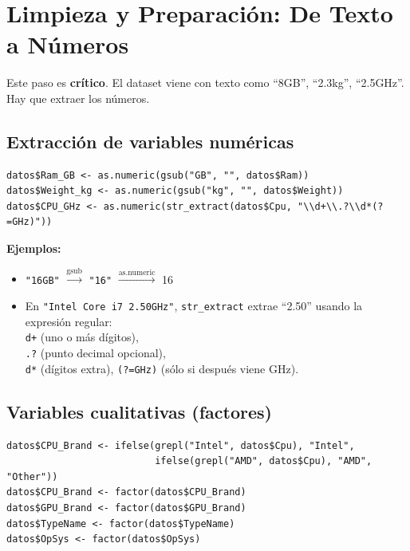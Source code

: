 \documentclass[12pt,a4paper]{article}
\begin{document}
\section{Limpieza y Preparación: De Texto a Números}

Este paso es \textbf{crítico}. El dataset viene con texto como ``8GB'', ``2.3kg'', ``2.5GHz''. Hay que extraer los números.

\subsection{Extracción de variables numéricas}

\begin{lstlisting}[caption={Limpiando datos}]
datos$Ram_GB <- as.numeric(gsub("GB", "", datos$Ram))
datos$Weight_kg <- as.numeric(gsub("kg", "", datos$Weight))
datos$CPU_GHz <- as.numeric(str_extract(datos$Cpu, "\\d+\\.?\\d*(?=GHz)"))
\end{lstlisting}

\textbf{Ejemplos:}
\begin{itemize}
    \item \texttt{"16GB"} $\xrightarrow{\text{gsub}}$ \texttt{"16"} $\xrightarrow{\text{as.numeric}}$ 16
    \item En \texttt{"Intel Core i7 2.50GHz"}, \texttt{str\_extract} extrae ``2.50'' usando la expresión regular: \texttt{\\d+} (uno o más dígitos), \texttt{\\.?} (punto decimal opcional), \texttt{\\d*} (dígitos extra), \texttt{(?=GHz)} (sólo si después viene GHz).
\end{itemize}

\subsection{Variables cualitativas (factores)}

\begin{lstlisting}[caption={Creando factores}]
datos$CPU_Brand <- ifelse(grepl("Intel", datos$Cpu), "Intel",
                          ifelse(grepl("AMD", datos$Cpu), "AMD", "Other"))
datos$CPU_Brand <- factor(datos$CPU_Brand)
datos$GPU_Brand <- factor(datos$GPU_Brand)
datos$TypeName <- factor(datos$TypeName)
datos$OpSys <- factor(datos$OpSys)
\end{lstlisting}
\end{document}
